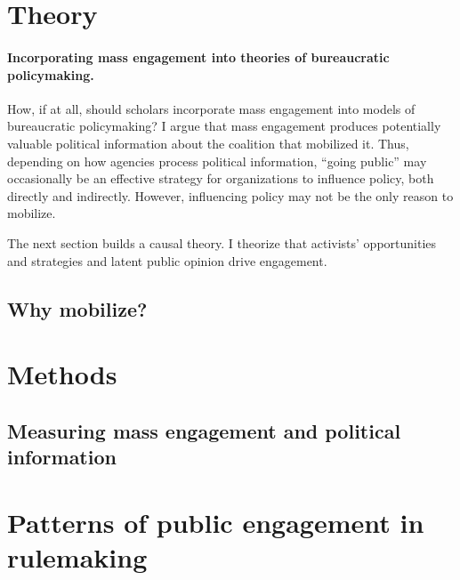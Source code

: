 \documentclass{article}
\begin{document}
\section{Theory} 
\paragraph{Incorporating mass engagement into theories of bureaucratic policymaking.}
How, if at all, should scholars incorporate mass engagement into models of bureaucratic policymaking? 
I argue that mass engagement produces potentially valuable political information about the coalition that mobilized it.
Thus, depending on how agencies process political information, ``going public'' may occasionally be an effective strategy for organizations to influence policy, both directly and indirectly. However, influencing policy may not be the only reason to mobilize. 

The next section builds a causal theory. I theorize that activists' opportunities and strategies and latent public opinion drive engagement.



\subsection{Why mobilize?} \label{whymail-intro}




\section{Methods}

\subsection{Measuring mass engagement and political information}
\label{whyMail-methods}



\section{Patterns of public engagement in rulemaking}

\end{document}
